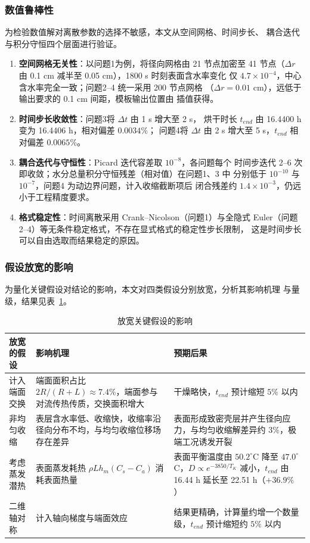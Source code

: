 \documentclass[12pt,a4paper]{article}
\begin{document}
\subsubsection{数值鲁棒性}
为检验数值解对离散参数的选择不敏感，本文从空间网格、时间步长、
耦合迭代与积分守恒四个层面进行验证。

\begin{enumerate}
\item \textbf{空间网格无关性}：以问题1为例，将径向网格由 21 节点加密至
41 节点（$\Delta r$ 由 0.1 cm 减半至 0.05 cm），1800 s 时刻表面含水率变化
仅 $4.7\times10^{-4}$，中心含水率完全一致；问题2--4 统一采用 200 节点网格
（$\Delta r=0.01$ cm），远低于输出要求的 0.1 cm 间距，模板输出位置由
插值获得。
\item \textbf{时间步长收敛性}：问题3将 $\Delta t$ 由 1 s 增大至 2 s，
烘干时长 $t_{end}$ 由 16.4400 h 变为 16.4406 h，相对偏差 $0.0034\%$；
问题4将 $\Delta t$ 由 2 s 增大至 5 s，$t_{end}$ 相对偏差 $0.0065\%$。
\item \textbf{耦合迭代与守恒性}：Picard 迭代容差取 $10^{-8}$，各问题每个
时间步迭代 2--6 次即收敛；水分总量积分守恒残差（相对值）在问题1、3 中
分别低于 $10^{-10}$ 与 $10^{-7}$，问题4 为动边界问题，计入收缩截断项后
闭合残差约 $1.4\times10^{-3}$，仍远小于工程精度要求。
\item \textbf{格式稳定性}：时间离散采用 Crank--Nicolson（问题1）与全隐式
Euler（问题2--4）等无条件稳定格式，不存在显式格式的稳定性步长限制，
这是时间步长可以自由选取而结果稳定的原因。
\end{enumerate}

\subsubsection{假设放宽的影响}
为量化关键假设对结论的影响，本文对四类假设分别放宽，分析其影响机理
与量级，结果见表~\ref{tab:assumption-relax}。

\begin{table}[H]
\centering
\caption{放宽关键假设的影响}
\label{tab:assumption-relax}
\begin{tabular}{p{3.6cm}p{6.2cm}p{4.4cm}}
\toprule
放宽的假设 & 影响机理 & 预期后果\\
\midrule
计入端面交换 & 端面面积占比 $2R/(R+L)\approx7.4\%$，端面参与对流传热传质，交换面积增大 & 干燥略快，$t_{end}$ 预计缩短 $5\%$ 以内\\
非均匀收缩 & 表层含水率低、收缩快，收缩率沿径向分布不均，与均匀收缩位移场存在差异 & 表面形成致密壳层并产生径向应力，与均匀收缩解差异约 $3\%$，极端工况诱发开裂\\
考虑蒸发潜热 & 表面蒸发耗热 $\rho L h_m(C_s-C_a)$ 消耗表面热量 & 表面平衡温度由 $50.2^\circ$C 降至 $47.0^\circ$C，$D\propto e^{-3850/T_K}$ 减小，$t_{end}$ 由 16.44 h 延长至 22.51 h（$+36.9\%$）\\
二维轴对称 & 计入轴向梯度与端面效应 & 结果更精确，计算量约增一个数量级，$t_{end}$ 预计缩短约 $5\%$ 以内\\
\bottomrule
\end{tabular}
\end{table}
\end{document}
